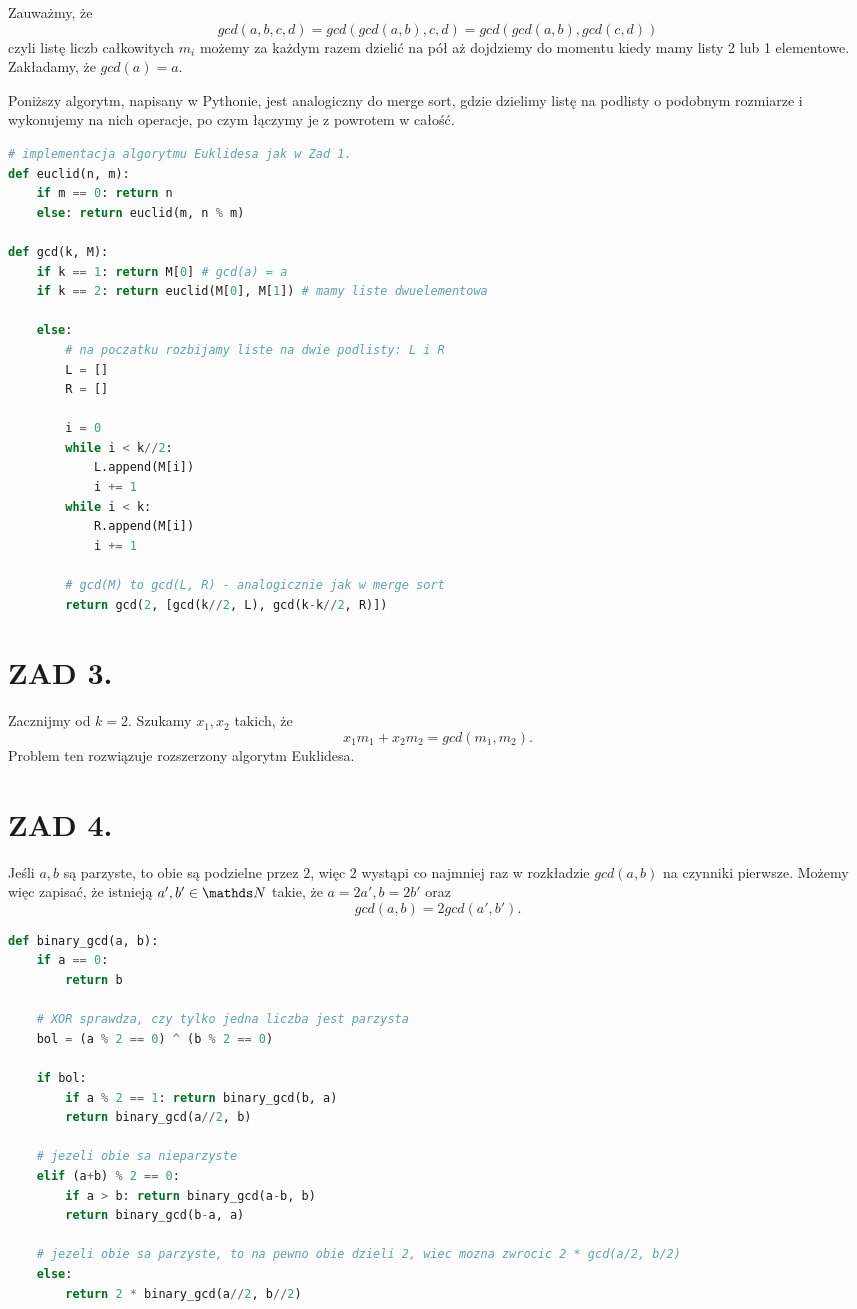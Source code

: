 \documentclass{article}[13pt]
\begin{document}
Zauważmy, że
$$gcd(a, b, c, d)=gcd(gcd(a, b), c, d)=gcd(gcd(a, b), gcd(c, d))$$
czyli listę liczb całkowitych $m_i$ możemy za każdym razem dzielić na pół aż dojdziemy do momentu kiedy mamy listy 2 lub 1 elementowe. Zakładamy, że $gcd(a)=a$. 

Poniższy algorytm, napisany w Pythonie, jest analogiczny do merge sort, gdzie dzielimy listę na podlisty o podobnym rozmiarze i wykonujemy na nich operacje, po czym łączymy je z powrotem w całość.

\begin{lstlisting}[language=Python]
# implementacja algorytmu Euklidesa jak w Zad 1.
def euclid(n, m):
    if m == 0: return n
    else: return euclid(m, n % m)

def gcd(k, M):
    if k == 1: return M[0] # gcd(a) = a
    if k == 2: return euclid(M[0], M[1]) # mamy liste dwuelementowa

    else: 
        # na poczatku rozbijamy liste na dwie podlisty: L i R
        L = []
        R = []

        i = 0
        while i < k//2:
            L.append(M[i])
            i += 1
        while i < k:
            R.append(M[i])
            i += 1

        # gcd(M) to gcd(L, R) - analogicznie jak w merge sort
        return gcd(2, [gcd(k//2, L), gcd(k-k//2, R)])
\end{lstlisting}

\section*{ZAD 3.}

Zacznijmy od $k=2$. Szukamy $x_1, x_2$ takich, że
$$x_1m_1+x_2m_2=gcd(m_1,m_2).$$
Problem ten rozwiązuje rozszerzony algorytm Euklidesa.


\section*{ZAD 4.}

Jeśli $a,b$ są parzyste, to obie są podzielne przez $2$, więc $2$ wystąpi co najmniej raz w rozkładzie $gcd(a,b)$ na czynniki pierwsze. Możemy więc zapisać, że istnieją $a',b'\in\N$ takie, że $a=2a',b=2b'$ oraz
$$gcd(a,b)=2gcd(a',b').$$

\begin{lstlisting}[language=Python]
def binary_gcd(a, b):
    if a == 0:
        return b

    # XOR sprawdza, czy tylko jedna liczba jest parzysta
    bol = (a % 2 == 0) ^ (b % 2 == 0)

    if bol:
        if a % 2 == 1: return binary_gcd(b, a)
        return binary_gcd(a//2, b)

    # jezeli obie sa nieparzyste
    elif (a+b) % 2 == 0:
        if a > b: return binary_gcd(a-b, b)
        return binary_gcd(b-a, a)
    
    # jezeli obie sa parzyste, to na pewno obie dzieli 2, wiec mozna zwrocic 2 * gcd(a/2, b/2)
    else:
        return 2 * binary_gcd(a//2, b//2)
\end{lstlisting}
\end{document}
